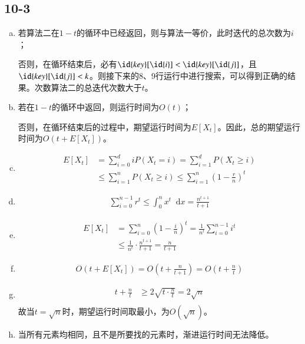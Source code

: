 \documentclass[twocolumn]{article}
\newcommand*{\dif}{\mathop{}\!\mathrm{d}}
\begin{document}
	\subsection*{10-3}
	\begin{enumerate}[(a)]
		\item 若算法二在$1-t$的循环中已经返回，则与算法一等价，此时迭代的总次数为$i$；\par 
		否则，在循环结束后，必有$\id{key}[\id{i}]<\id{key}[\id{j}]$，且$\id{key}[\id{j}]<k$。则接下来的8、9行运行中进行搜索，可以得到正确的结果。次数算法二的总迭代次数大于$t$。
		\item 若在$1-t$的循环中返回，则运行时间为$O(t)$；\par 
		否则，在\For 循环结束后的过程中，期望运行时间为$E[X_t]$。因此，总的期望运行时间为$O(t+E[X_t])$。
		\item 
		\[
			\begin{aligned}
				E[X_t]&=\sum_{i=0}^{d}iP(X_t=i)=\sum_{i=1}^{d}P(X_t\ge i)\\
				&\le \sum_{i=1}^{n}P(X_t\ge i)\le \sum_{i=1}^{n}\left(1-\frac{r}{n}\right)^t
			\end{aligned}
		\]
		\item 
		\[
			\begin{aligned}
				\sum_{i=0}^{n-1}r^t\le \int_{0}^{n}x^t\dif x=\frac{n^{t+1}}{t+1}
			\end{aligned}
		\]
		\item 
		\[
			\begin{aligned}
				E[X_t]&=\sum_{i=0}^{n}\left(1-\frac{i}{n}\right)^t=\frac{1}{n^t}\sum_{i=0}^{n-1}i^t\\
				&\le \frac{1}{n^t}\cdot \frac{n^{t+1}}{t+1}=\frac{n}{t+1}
			\end{aligned}
		\]
		\item 
		\[
			\begin{aligned}
				O(t+E[X_t])=O\left(t+\frac{n}{t+1}\right)=O\left(t+\frac{n}{t}\right)
			\end{aligned}
		\]
		\item 
		\[
			\begin{aligned}
				t+\frac{n}{t}&\ge 2\sqrt{t\cdot \frac{n}{t}}=2\sqrt{n}\\
			\end{aligned}
		\]
		故当$t=\sqrt{n}$时，期望运行时间取最小，为$O(\sqrt{n})$。
		\item 
		当所有元素均相同，且不是所要找的元素时，渐进运行时间无法降低。
	\end{enumerate}
\end{document}
